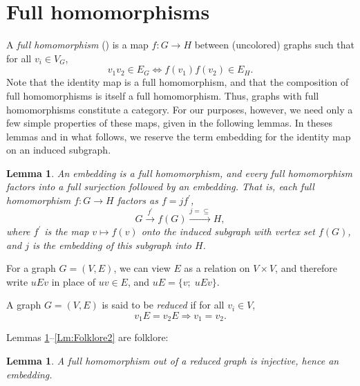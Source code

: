\documentclass[12pt]{amsart}
\theoremstyle{plain}
\newtheorem{lemma}[theorem]{Lemma}
\numberwithin{equation}{section}
\begin{document}
\section{Full homomorphisms\label{Sec:FullHom}}

A \emph{full homomorphism} (\cite{HellNesetril:2004}) is a map $f:G\rightarrow
H$ between (uncolored) graphs such that for all $v_{i}\in V_{G}$,
\begin{displaymath}
    v_{1}v_{2}\in E_{G}\Longleftrightarrow f\left(  v_{1}\right)  f\left(
    v_{2}\right)  \in E_{H}.
\end{displaymath}
Note that the identity map is a full homomorphism, and that the composition of
full homomorphisms is itself a full homomorphism. Thus, graphs with full
homomorphisms constitute a category. For our purposes, however, we need only a
few simple properties of these maps, given in the following lemmas. In theses
lemmas and in what follows, we reserve the term embedding for the identity map
on an induced subgraph.

\begin{lemma}
\label{Lem:FullHom1}An embedding is a full homomorphism, and every full
homomorphism factors into a full surjection followed by an embedding. That is,
each full homomorphism $f:G\rightarrow H$ factors as $f=jf^{\prime}$,
\begin{displaymath}
    G\overset{f^{\prime}}{\rightarrow}f\left(  G\right)  \overset{j=\subseteq
    }{\rightarrow}H,
\end{displaymath}
where $f^{\prime}$ is the map $v\longmapsto f\left(  v\right)  $ onto the
induced subgraph with vertex set $f\left(  G\right)  $, and $j$ is the
embedding of this subgraph into $H$.
\end{lemma}

For a graph $G=(V,E)$, we can view $E$ as a relation on $V\times V$, and
therefore write $uEv$ in place of $uv\in E$, and $uE=\{v;\;uEv\}$.

A graph $G=\left(  V,E\right)$ is said to be \emph{reduced} if for all
$v_{i}\in V$,
\begin{displaymath}
    v_{1}E=v_{2}E\Longrightarrow v_{1}=v_{2}.
\end{displaymath}

Lemmas \ref{Lm:Folklore1}--\ref{Lm:Folklore2} are folklore:

\begin{lemma}\label{Lm:Folklore1}
\label{Lem:FullHom2}A full homomorphism out of a reduced graph is injective,
hence an embedding.
\end{lemma}
\end{document}

